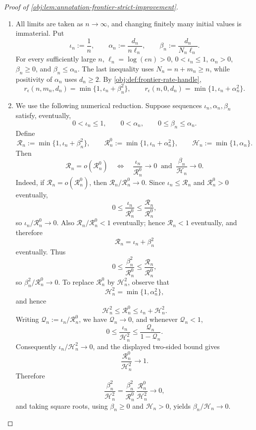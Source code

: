 \documentclass[11pt]{article}
\begin{document}
\begin{proof}[Proof of \cref{obj:lem:annotation-frontier-strict-improvement}]
\begin{enumerate}
\item
All limits are taken as \(n\to\infty\), and changing finitely many initial values is immaterial.  Put
\[
\iota_n:=\frac1n,\qquad
\alpha_n:=\frac{d_n}{n\ell_n},\qquad
\beta_n:=\frac{d_n}{N_n\ell_n}.
\]
For every sufficiently large \(n\), \(\ell_n=\log(en)>0\), \(0<\iota_n\le 1\), \(\alpha_n>0\), \(\beta_n\ge0\), and \(\beta_n\le\alpha_n\).  The last inequality uses \(N_n=n+m_n\ge n\), while positivity of \(\alpha_n\) uses \(d_n\ge2\).
By \cref{obj:def:frontier-rate-handle},
\[
r_\epsilon(n,m_n,d_n)=\min\{1,\iota_n+\beta_n^2\},
\qquad
r_\epsilon(n,0,d_n)=\min\{1,\iota_n+\alpha_n^2\}.
\]

\item
We use the following numerical reduction.  Suppose sequences
\(\iota_n,\alpha_n,\beta_n\) satisfy, eventually,
\[
0<\iota_n\le1,\qquad 0<\alpha_n,\qquad 0\le\beta_n\le\alpha_n.
\]
Define
\[
\mathcal R_n:=\min\{1,\iota_n+\beta_n^2\},\qquad
\mathcal R^0_n:=\min\{1,\iota_n+\alpha_n^2\},\qquad
\mathcal H_n:=\min\{1,\alpha_n\}.
\]
Then
\[
\mathcal R_n=o(\mathcal R^0_n)
\quad\Longleftrightarrow\quad
\frac{\iota_n}{\mathcal R^0_n}\to0
\ \text{ and }\
\frac{\beta_n}{\mathcal H_n}\to0.
\]
Indeed, if \(\mathcal R_n=o(\mathcal R^0_n)\), then
\(\mathcal R_n/\mathcal R^0_n\to0\).  Since
\(\iota_n\le\mathcal R_n\) and \(\mathcal R^0_n>0\) eventually,
\[
0\le\frac{\iota_n}{\mathcal R^0_n}
\le
\frac{\mathcal R_n}{\mathcal R^0_n},
\]
so \(\iota_n/\mathcal R^0_n\to0\).  Also
\(\mathcal R_n/\mathcal R^0_n<1\) eventually; hence \(\mathcal R_n<1\) eventually, and therefore
\[
\mathcal R_n=\iota_n+\beta_n^2
\]
eventually.  Thus
\[
0\le
\frac{\beta_n^2}{\mathcal R^0_n}
\le
\frac{\mathcal R_n}{\mathcal R^0_n},
\]
so \(\beta_n^2/\mathcal R^0_n\to0\).  To replace \(\mathcal R^0_n\) by \(\mathcal H_n^2\), observe that
\[
\mathcal H_n^2=\min\{1,\alpha_n^2\},
\]
and hence
\[
\mathcal H_n^2\le \mathcal R^0_n\le \iota_n+\mathcal H_n^2.
\]
Writing \(\mathcal Q_n:=\iota_n/\mathcal R^0_n\), we have \(\mathcal Q_n\to0\), and whenever
\(\mathcal Q_n<1\),
\[
0\le
\frac{\iota_n}{\mathcal H_n^2}
\le
\frac{\mathcal Q_n}{1-\mathcal Q_n}.
\]
Consequently \(\iota_n/\mathcal H_n^2\to0\), and the displayed two-sided bound gives
\[
\frac{\mathcal R^0_n}{\mathcal H_n^2}\to1.
\]
Therefore
\[
\frac{\beta_n^2}{\mathcal H_n^2}
=
\frac{\beta_n^2}{\mathcal R^0_n}\,
\frac{\mathcal R^0_n}{\mathcal H_n^2}
\to0,
\]
and taking square roots, using \(\beta_n\ge0\) and \(\mathcal H_n>0\), yields
\(\beta_n/\mathcal H_n\to0\).


\end{enumerate}
\end{proof}
\end{document}
